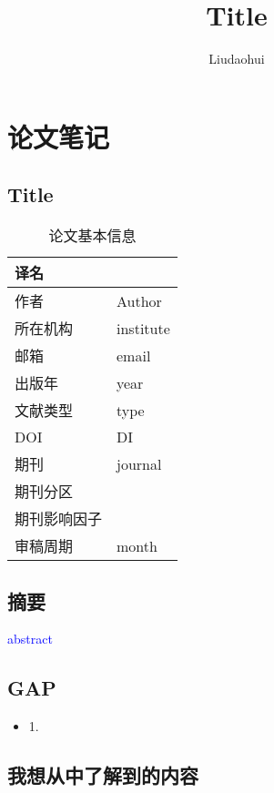 \documentclass{readarticle}
\begin{document}
  
\title{Title}
\author{Liudaohui}
\maketitle{}
\newpage
\section{论文笔记}

\subsection{Title}
    \begin{table}[htbp]
        \centering
        \small
        \caption{论文基本信息}
        \begin{tabular}{l|l}
            \toprule
            译名          & \\
            \midrule
            作者          & Author \\
            所在机构      & institute\\
            邮箱         & email \\
            出版年        & year \\
            文献类型      & type \\
            DOI          & DI \\
            期刊          & journal \\
            期刊分区      & \\
            期刊影响因子  & \\
            审稿周期     & month\\
            \bottomrule
        \end{tabular}%
        \label{tab:n.infomation}%
    \end{table}%
\subsection*{摘要}
\textcolor{blue}{abstract}
\newpage
\subsection{GAP}
    \begin{itemize}
        \item 1. 
    \end{itemize}

\subsection{我想从中了解到的内容}
\end{document}
